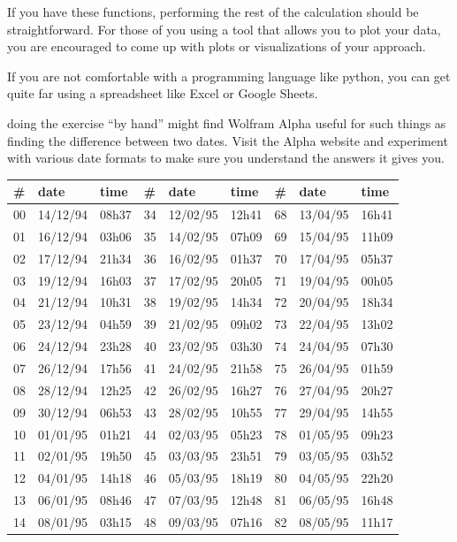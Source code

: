 \documentclass{tufte-handout}
\begin{document}
If you have these functions, performing the rest of the calculation should be straightforward. For those of you using a tool that allows you to 
plot your data, you are encouraged to come up with plots or visualizations of your approach.

If you are not comfortable with a programming language like python, you can get quite far using a spreadsheet like Excel or Google Sheets.

 doing the exercise ``by hand'' might find Wolfram Alpha useful for such things as finding the difference between two dates.  Visit the Alpha website and experiment with various date formats to make sure you understand the answers it gives you.


\begin{table}
\begin{tabular}{lll|lll|lll}
\# & date & time & \# & date & time & \# & date & time \\ \hline
00 & 14/12/94 & 08h37 & 34 & 12/02/95 & 12h41 & 68 & 13/04/95 & 16h41 \\
01 & 16/12/94 & 03h06 & 35 & 14/02/95 & 07h09 & 69 & 15/04/95 & 11h09 \\
02 & 17/12/94 & 21h34 & 36 & 16/02/95 & 01h37 & 70 & 17/04/95 & 05h37 \\
03 & 19/12/94 & 16h03 & 37 & 17/02/95 & 20h05 & 71 & 19/04/95 & 00h05 \\
04 & 21/12/94 & 10h31 & 38 & 19/02/95 & 14h34 & 72 & 20/04/95 & 18h34 \\
05 & 23/12/94 & 04h59 & 39 & 21/02/95 & 09h02 & 73 & 22/04/95 & 13h02 \\
06 & 24/12/94 & 23h28 & 40 & 23/02/95 & 03h30 & 74 & 24/04/95 & 07h30 \\
07 & 26/12/94 & 17h56 & 41 & 24/02/95 & 21h58 & 75 & 26/04/95 & 01h59 \\
08 & 28/12/94 & 12h25 & 42 & 26/02/95 & 16h27 & 76 & 27/04/95 & 20h27 \\
09 & 30/12/94 & 06h53 & 43 & 28/02/95 & 10h55 & 77 & 29/04/95 & 14h55 \\
10 & 01/01/95 & 01h21 & 44 & 02/03/95 & 05h23 & 78 & 01/05/95 & 09h23 \\
11 & 02/01/95 & 19h50 & 45 & 03/03/95 & 23h51 & 79 & 03/05/95 & 03h52 \\
12 & 04/01/95 & 14h18 & 46 & 05/03/95 & 18h19 & 80 & 04/05/95 & 22h20 \\
13 & 06/01/95 & 08h46 & 47 & 07/03/95 & 12h48 & 81 & 06/05/95 & 16h48 \\
14 & 08/01/95 & 03h15 & 48 & 09/03/95 & 07h16 & 82 & 08/05/95 & 11h17 \\

\end{tabular}
\end{table}
\end{document}
